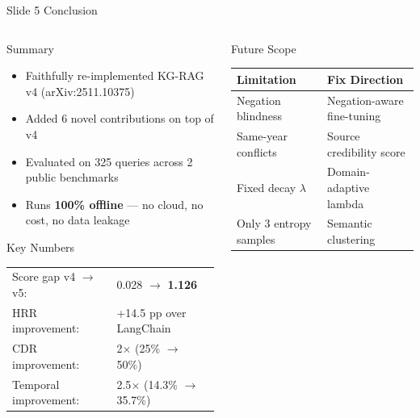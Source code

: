 \documentclass[aspectratio=169, 10pt]{beamer}
\begin{document}
\begin{frame}{Slide 5 \quad Conclusion}

\begin{columns}[T]
\begin{column}{0.46\textwidth}
  \begin{block}{\small Summary}
    \scriptsize
    \begin{itemize}\setlength\itemsep{3pt}
      \item Faithfully re-implemented KG-RAG v4 (arXiv:2511.10375)
      \item Added 6 novel contributions on top of v4
      \item Evaluated on 325 queries across 2 public benchmarks
      \item Runs \textbf{100\% offline} — no cloud, no cost,
            no data leakage
    \end{itemize}
  \end{block}
  \vspace{4pt}
  \begin{block}{\small Key Numbers}
    \scriptsize
    \begin{tabular}{ll}
      Score gap v4 $\to$ v5: & 0.028 $\to$ \textbf{1.126} \\
      HRR improvement:        & +14.5 pp over LangChain \\
      CDR improvement:        & 2$\times$ (25\% $\to$ 50\%) \\
      Temporal improvement:   & 2.5$\times$ (14.3\% $\to$ 35.7\%) \\
    \end{tabular}
  \end{block}
\end{column}
\begin{column}{0.50\textwidth}
  \begin{block}{\small Future Scope}
    \scriptsize
    \begin{tabular}{L{2.5cm}L{3.2cm}}
      \toprule
      \textbf{Limitation} & \textbf{Fix Direction} \\
      \midrule
      Negation blindness  & Negation-aware fine-tuning \\
      Same-year conflicts & Source credibility score \\
      Fixed decay $\lambda$ & Domain-adaptive lambda \\
      Only 3 entropy samples & Semantic clustering \\

\end{tabular}
\end{block}
\end{column}
\end{columns}
\end{frame}
\end{document}
